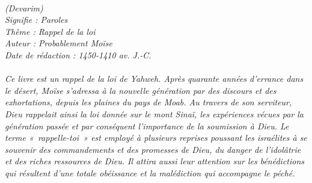 \BFont
\noindent\hrulefill
{\footnotesize
\textit{
\bigskip
{\centering{}
\\(Devarim)
\\Signifie : Paroles
\\Thème : Rappel de la loi
\\Auteur : Probablement Moïse
\\Date de rédaction : 1450-1410 av. J.-C.\\}
}
\textit{
\\Ce livre est un rappel de la loi de Yahweh. Après quarante années d’errance dans le désert,  Moïse s’adressa à la nouvelle génération par des discours et des exhortations, depuis les plaines du pays de Moab. Au travers de son serviteur, Dieu rappelait ainsi la loi donnée sur le mont Sinaï, les expériences vécues par la génération passée et par conséquent l’importance de la soumission à Dieu. Le terme «~rappelle-toi~» est employé à plusieurs reprises poussant les israélites à se souvenir des commandements et des promesses de Dieu, du danger de l’idolâtrie et des riches ressources de Dieu. Il attira aussi leur attention sur les bénédictions qui résultent d’une totale obéissance et la malédiction qui accompagne le péché.\bigskip
}
}
\par\nobreak\noindent\hrulefill
